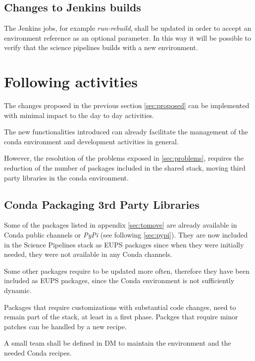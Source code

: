 \subsection{Changes to Jenkins builds} \label{sec:cibuilds}

The Jenkins jobs, for example \textit{run-rebuild}, shall be updated in order to accept an environment reference as an optional parameter.
In this way it will be possible to verify that the science pipelines builds with a new environment.


\newpage
\section{Following activities} \label{sec:follows}

The changes proposed in the previous section \ref{sec:proposed} can be implemented with minimal impact to the day to day activities.

The new functionalities introduced can already facilitate the management of the conda environment and development activities in general.

However, the resolution of the problems exposed in \ref{sec:problems}, requires the reduction of the number of packages included in the shared stack, moving third party libraries in the conda environment.


\subsection{Conda Packaging 3rd Party Libraries} \label{sec:3rdpkgs}

Some of the packages listed in appendix \ref{sec:tomove} are already available in Conda public channels or \textit{PyPi} (see following \ref{sec:pypi}).
They are now included in the Science Pipelines stack as EUPS packages since when they were initially needed, they were not available in any Conda channels.

Some other packages require to be updated more often, therefore they have been included as EUPS packages, since the Conda environment is not sufficiently dynamic.

Packages that require customizations with substantial code changes, need to remain part of the stack, at least in a first phase. 
Packges that require minor patches can be handled by a new recipe.

A small team shall be defined in DM to maintain the environment and the needed Conda recipes.


